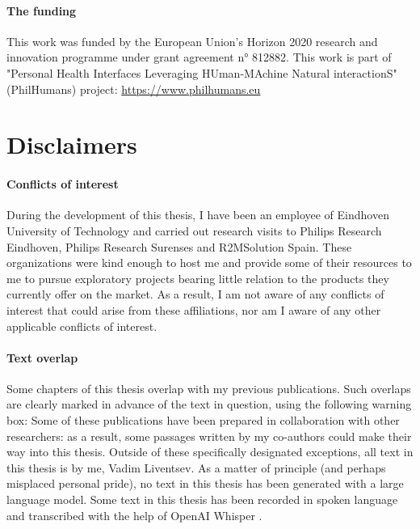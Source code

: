 \paragraph{The funding}

This work was funded by the European Union’s Horizon 2020 research and innovation programme under grant agreement n° 812882. This work is part of "Personal Health Interfaces Leveraging HUman-MAchine Natural interactionS" (PhilHumans) project: \url{https://www.philhumans.eu}

\newpage
\section{Disclaimers}

\paragraph{Conflicts of interest}

During the development of this thesis, I have been an employee of Eindhoven University of Technology and carried out research visits to Philips Research Eindhoven, Philips Research Surenses and R2MSolution Spain.
These organizations were kind enough to host me and provide some of their resources to me to pursue exploratory projects bearing little relation to the products they currently offer on the market.
As a result, I am not aware of any conflicts of interest that could arise from these affiliations, nor am I aware of any other applicable conflicts of interest.

\paragraph{Text overlap}

Some chapters of this thesis overlap with my previous publications.
Such overlaps are clearly marked in advance of the text in question, using the following warning box:
Some of these publications have been prepared in collaboration with other researchers: as a result, some passages written by my co-authors could make their way into this thesis.
Outside of these specifically designated exceptions, all text in this thesis is by me, Vadim Liventsev.
As a matter of principle (and perhaps misplaced personal pride), no text in this thesis has been generated with a large language model.
Some text in this thesis has been recorded in spoken language and transcribed with the help of OpenAI Whisper \cite{radfordRobustSpeechRecognition2022}.

